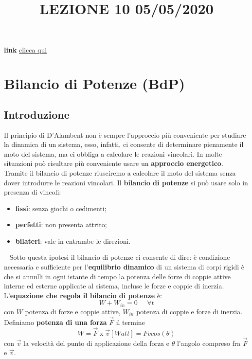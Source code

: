 \title{LEZIONE 10 05/05/2020}\newline
\textbf{link} \href{https://web.microsoftstream.com/video/7c71a45c-bec9-4bd9-b9f1-d200f427542e}{clicca qui}
\section{Bilancio di Potenze (BdP)}
\subsection{Introduzione}
Il principio di D'Alambent non è sempre l'approccio più conveniente per studiare la dinamica di un sistema, esso, infatti, ci consente di determinare pienamente il moto del sistema, ma ci obbliga a calcolare le reazioni vincolari. In molte situazioni può risultare più conveniente usare un \textbf{approccio energetico}.\newline
\newline
Tramite il bilancio di potenze riusciremo a calcolare il moto del sistema senza dover introdurre le reazioni vincolari.\newline
\newline
Il \textbf{bilancio di potenze} si può usare solo in presenza di vincoli:
\begin{itemize}
    \item \textbf{fissi}: senza giochi o cedimenti;
    \item \textbf{perfetti}: non presenta attrito;
    \item \textbf{bilateri}: vale in entrambe le direzioni.
\end{itemize}
\ \newline
Sotto questa ipotesi il bilancio di potenze ci consente di dire: è condizione necessaria e sufficiente per l'\textbf{equilibrio dinamico} di un sistema di corpi rigidi è che si annulli in ogni istante di tempo la potenza delle forze di coppie attive interne ed esterne applicate al sistema, incluse le forze e coppie di inerzia.\newline
\newline
L'\textbf{equazione che regola il bilancio di potenze} è:
\[
    W + W_{in} = 0 \;\;\;\;\;\forall t
\]
con $W$ potenza di forze e coppie attive, $W_{in}$ potenza di coppie e forze di inerzia.\newline
\newline
Definiamo \textbf{potenza di una forza} $\vec{F}$ il termine
\[
    W = \vec{F} \;\text{x}\; \vec{v} [Watt] = F v cos(\theta)
\]
con $\vec{v}$ la velocità del punto di applicazione della forza e $\theta$ l'angolo compreso fra $\vec{F}$ e $\vec{v}$.\newline
